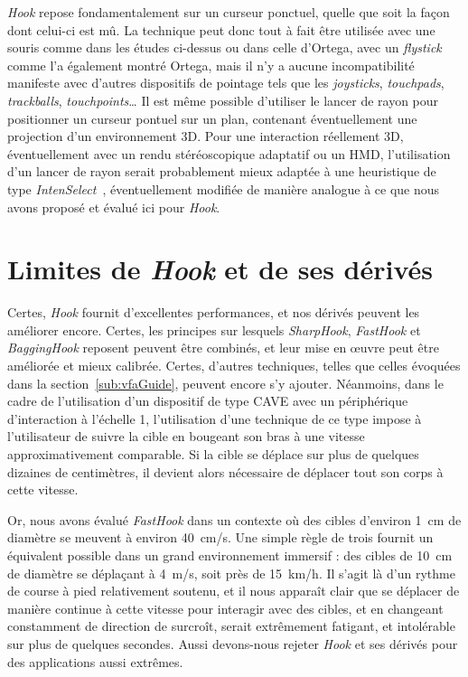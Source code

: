 	\emph{Hook} repose fondamentalement sur un curseur ponctuel, quelle que soit la façon dont celui-ci est mû. La technique peut donc tout à fait être utilisée avec une souris comme dans les études ci-dessus ou dans celle d'Ortega, avec un \emph{flystick} comme l'a également montré Ortega, mais il n'y a aucune incompatibilité manifeste avec d'autres dispositifs de pointage tels que les \emph{joysticks}, \emph{touchpads}, \emph{trackballs}, \emph{touchpoints}\ldots{} Il est même possible d'utiliser le lancer de rayon pour positionner un curseur pontuel sur un plan, contenant éventuellement une projection d'un environnement 3D. Pour une interaction réellement 3D, éventuellement avec un rendu stéréoscopique adaptatif ou un HMD, l'utilisation d'un lancer de rayon serait probablement mieux adaptée à une heuristique de type \emph{IntenSelect}~\cite{de2005intenselect}, éventuellement modifiée de manière analogue à ce que nous avons proposé et évalué ici pour \emph{Hook}.
	
		
\section{Limites de \emph{Hook} et de ses dérivés}
	Certes, \emph{Hook} fournit d'excellentes performances, et nos dérivés peuvent les améliorer encore. Certes, les principes sur lesquels \emph{SharpHook}, \emph{FastHook} et \emph{BaggingHook} reposent peuvent être combinés, et leur mise en œuvre peut être améliorée et mieux calibrée. Certes, d'autres techniques, telles que celles évoquées dans la section~\ref{sub:vfaGuide}, peuvent encore s'y ajouter. Néanmoins, dans le cadre de l'utilisation d'un dispositif de type CAVE avec un périphérique d'interaction à l'échelle 1, l'utilisation d'une technique de ce type impose à l'utilisateur de suivre la cible en bougeant son bras à une vitesse approximativement comparable. Si la cible se déplace sur plus de quelques dizaines de centimètres, il devient alors nécessaire de déplacer tout son corps à cette vitesse.
	
	Or, nous avons évalué \emph{FastHook} dans un contexte où des cibles d'environ 1~cm de diamètre se meuvent à environ 40~cm/s. Une simple règle de trois fournit un équivalent possible dans un grand environnement immersif : des cibles de 10~cm de diamètre se déplaçant à 4~m/s, soit près de 15~km/h. Il s'agit là d'un rythme de course à pied relativement soutenu, et il nous apparaît clair que se déplacer de manière continue à cette vitesse pour interagir avec des cibles, et en changeant constamment de direction de surcroît, serait extrêmement fatigant, et intolérable sur plus de quelques secondes. Aussi devons-nous rejeter \emph{Hook} et ses dérivés pour des applications aussi extrêmes.
	
